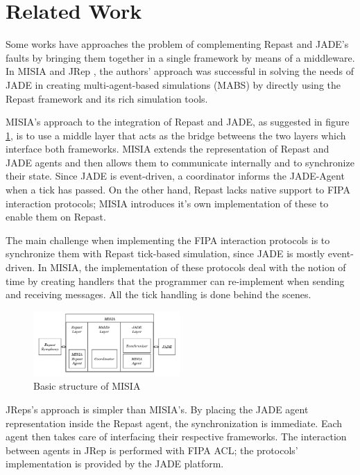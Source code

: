 \section{Related Work} %
\label{sec:related_work}

Some works have approaches the problem of complementing Repast and JADE's faults by bringing them together in a single framework by means of a middleware. In MISIA \cite{garcia2011misia} and JRep \cite{gormer2011jrep}, the authors' approach was successful in solving the needs of JADE in creating multi-agent-based simulations (MABS) by directly using the Repast framework and its rich simulation tools.

MISIA's approach to the integration of Repast and JADE, as suggested in figure \ref{fig:misia}, is to use a middle layer that acts as the bridge betweens the two layers which interface both frameworks. MISIA extends the representation of Repast and JADE agents and then allows them to communicate internally and to synchronize their state. Since JADE is event-driven, a coordinator informs the JADE-Agent when a tick has passed. On the other hand, Repast lacks native support to FIPA interaction protocols; MISIA introduces it's own implementation of these to enable them on Repast.

The main challenge when implementing the FIPA interaction protocols is to synchronize them with Repast tick-based simulation, since JADE is mostly event-driven. In MISIA, the implementation of these protocols deal with the notion of time by creating handlers that the programmer can re-implement when sending and receiving messages. All the tick handling is done behind the scenes.

\begin{figure}[h]
	\centering
	\includegraphics[width=0.5\textwidth]{figures/MISIA.png}
	\caption{Basic structure of MISIA}
	\label{fig:misia}
\end{figure}

JReps's approach is simpler than MISIA's. By placing the JADE agent representation inside the Repast agent, the synchronization is immediate. Each agent then takes care of interfacing their respective frameworks. The interaction between agents in JRep is performed with FIPA ACL; the protocols' implementation is provided by the JADE platform.

